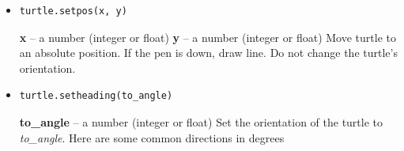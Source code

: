 \documentclass[a4paper]{article}
\begin{document}
\begin{itemize}
\item
\begin{lstlisting}
turtle.setpos(x, y)
\end{lstlisting}
\textbf{x} – a number (integer or float) \newline
\textbf{y} – a number (integer or float) \newline
Move turtle to an absolute position. If the pen is down, draw line. Do not change the turtle’s orientation.


\item
\begin{lstlisting}
turtle.setheading(to_angle)
\end{lstlisting}
\textbf{to\_angle} – a number (integer or float) \newline
Set the orientation of the turtle to \textit{to\_angle}. Here are some common directions in degrees

\end{itemize}
\end{document}
